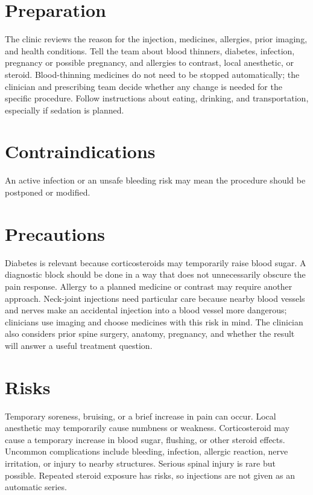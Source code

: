 \section*{Preparation}
The clinic reviews the reason for the injection, medicines, allergies, prior imaging, and health conditions. Tell the team about blood thinners, diabetes, infection, pregnancy or possible pregnancy, and allergies to contrast, local anesthetic, or steroid. Blood-thinning medicines do not need to be stopped automatically; the clinician and prescribing team decide whether any change is needed for the specific procedure. Follow instructions about eating, drinking, and transportation, especially if sedation is planned.

\section*{Contraindications}
An active infection or an unsafe bleeding risk may mean the procedure should be postponed or modified.

\section*{Precautions}
Diabetes is relevant because corticosteroids may temporarily raise blood sugar. A diagnostic block should be done in a way that does not unnecessarily obscure the pain response. Allergy to a planned medicine or contrast may require another approach. Neck-joint injections need particular care because nearby blood vessels and nerves make an accidental injection into a blood vessel more dangerous; clinicians use imaging and choose medicines with this risk in mind. The clinician also considers prior spine surgery, anatomy, pregnancy, and whether the result will answer a useful treatment question.

\section*{Risks}
Temporary soreness, bruising, or a brief increase in pain can occur. Local anesthetic may temporarily cause numbness or weakness. Corticosteroid may cause a temporary increase in blood sugar, flushing, or other steroid effects. Uncommon complications include bleeding, infection, allergic reaction, nerve irritation, or injury to nearby structures. Serious spinal injury is rare but possible. Repeated steroid exposure has risks, so injections are not given as an automatic series.

